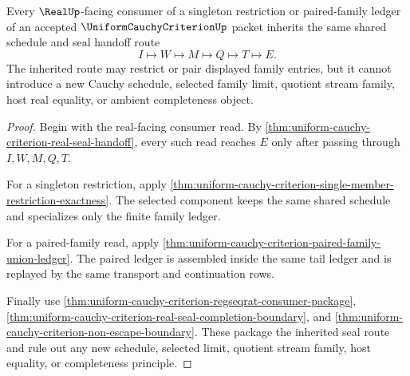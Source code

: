 \begin{theorem}
\label{thm:uniform-cauchy-criterion-shared-schedule-real-seal-inheritance}
Every $\RealUp$-facing consumer of a singleton restriction or paired-family ledger of an accepted $\UniformCauchyCriterionUp$ packet inherits the same shared schedule and seal handoff route
$$
I \longmapsto W \longmapsto M \longmapsto Q \longmapsto T \longmapsto E.
$$
The inherited route may restrict or pair displayed family entries, but it cannot introduce a new Cauchy schedule, selected family limit, quotient stream family, host real equality, or ambient completeness object.
\end{theorem}
\begin{proof}
Begin with the real-facing consumer read. By \autoref{thm:uniform-cauchy-criterion-real-seal-handoff}, every such read reaches $E$ only after passing through $I,W,M,Q,T$.

For a singleton restriction, apply \autoref{thm:uniform-cauchy-criterion-single-member-restriction-exactness}. The selected component keeps the same shared schedule and specializes only the finite family ledger.

For a paired-family read, apply \autoref{thm:uniform-cauchy-criterion-paired-family-union-ledger}. The paired ledger is assembled inside the same tail ledger and is replayed by the same transport and continuation rows.

Finally use \autoref{thm:uniform-cauchy-criterion-regseqrat-consumer-package}, \autoref{thm:uniform-cauchy-criterion-real-seal-completion-boundary}, and \autoref{thm:uniform-cauchy-criterion-non-escape-boundary}. These package the inherited seal route and rule out any new schedule, selected limit, quotient stream family, host equality, or completeness principle.
\end{proof}

